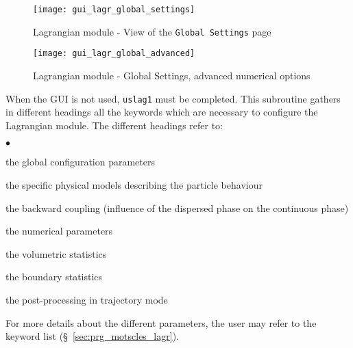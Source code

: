 {{\begin{figure}[ht]
\begin{center}
\texttt{[image: gui\_lagr\_global\_settings]}
\caption{Lagrangian module - View of the \texttt{Global Settings} page}
\label{fig:Ini-Lag1}
\end{center}
\end{figure}
%
%
 \begin{figure}[ht]
 \begin{center}
 \texttt{[image: gui\_lagr\_global\_advanced]}
 \caption{Lagrangian module - Global Settings, advanced numerical options}
 \label{fig:Ini-Lag3}
 \end{center}
 \end{figure}
%
%


\noindent
When the GUI is not used, \texttt{uslag1} must be completed. This subroutine
gathers in different headings all the keywords which are
necessary to configure the Lagrangian module. The different headings refer to:
\begin{list}{$\bullet$}{}
\item the global configuration parameters
\item the specific physical models describing the particle behaviour
\item the backward coupling (influence of the dispersed phase on the
      continuous phase)
\item the numerical parameters
\item the volumetric statistics
\item the boundary statistics
\item the post-processing in trajectory mode
\end{list}
%
\noindent
For more details about the different parameters, the user may refer to the
keyword list (\S~\ref{sec:prg_motscles_lagr}).%




}}
